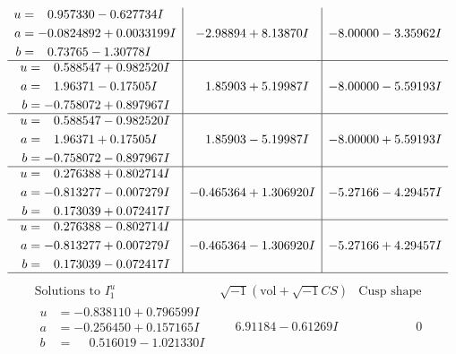 \documentclass[1p]{elsarticle_modified}
\theoremstyle{definition}
\newcommand{\I}{\sqrt{-1}}
\begin{document}
$$\begin{array}{c|c|c}
\begin{aligned}
u &= \phantom{-}0.957330 - 0.627734 I \\
a &= -0.0824892 + 0.0033199 I \\
b &= \phantom{-}0.73765 - 1.30778 I\end{aligned}
 & -2.98894 + 8.13870 I & -8.00000 - 3.35962 I \\ \hline\begin{aligned}
u &= \phantom{-}0.588547 + 0.982520 I \\
a &= \phantom{-}1.96371 - 0.17505 I \\
b &= -0.758072 + 0.897967 I\end{aligned}
 & \phantom{-}1.85903 + 5.19987 I & -8.00000 - 5.59193 I \\ \hline\begin{aligned}
u &= \phantom{-}0.588547 - 0.982520 I \\
a &= \phantom{-}1.96371 + 0.17505 I \\
b &= -0.758072 - 0.897967 I\end{aligned}
 & \phantom{-}1.85903 - 5.19987 I & -8.00000 + 5.59193 I \\ \hline\begin{aligned}
u &= \phantom{-}0.276388 + 0.802714 I \\
a &= -0.813277 - 0.007279 I \\
b &= \phantom{-}0.173039 + 0.072417 I\end{aligned}
 & -0.465364 + 1.306920 I & -5.27166 - 4.29457 I \\ \hline\begin{aligned}
u &= \phantom{-}0.276388 - 0.802714 I \\
a &= -0.813277 + 0.007279 I \\
b &= \phantom{-}0.173039 - 0.072417 I\end{aligned}
 & -0.465364 - 1.306920 I & -5.27166 + 4.29457 I\\
 \hline 
 \end{array}$$\newpage$$\begin{array}{c|c|c}  
\text{Solutions to }I^u_{1}& \I (\text{vol} + \sqrt{-1}CS) & \text{Cusp shape}\\
 \hline 
\begin{aligned}
u &= -0.838110 + 0.796599 I \\
a &= -0.256450 + 0.157165 I \\
b &= \phantom{-}0.516019 - 1.021330 I\end{aligned}
 & \phantom{-}6.91184 - 0.61269 I & \phantom{-0.000000 } 0 \\ \hline\begin{aligned}

\end{aligned}
\end{array}$$
\end{document}

